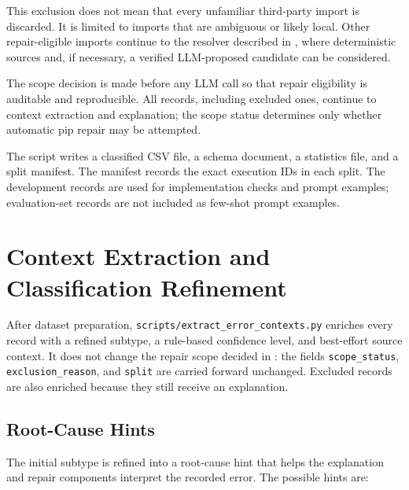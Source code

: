 This exclusion does not mean that every unfamiliar third-party import is
discarded. It is limited to imports that are ambiguous or likely local. Other
repair-eligible imports continue to the resolver described in
, where deterministic sources and, if necessary, a
verified LLM-proposed candidate can be considered.

The scope decision is made before any LLM call so that repair eligibility is
auditable and reproducible. All records, including excluded ones, continue
to context extraction and explanation; the scope status determines only
whether automatic pip repair may be attempted.

The script writes a classified CSV file, a schema document, a statistics
file, and a split manifest. The manifest records the exact execution IDs in
each split. The development records are used for implementation checks and
prompt examples; evaluation-set records are not included as few-shot prompt
examples.

\section{Context Extraction and Classification Refinement}
\label{sec:m-classification}

After dataset preparation, \texttt{scripts/extract\_error\_contexts.py}
enriches every record with a refined subtype, a rule-based confidence level,
and best-effort source context. It does not change the repair scope decided
in : the fields \texttt{scope\_status},
\texttt{exclusion\_reason}, and \texttt{split} are carried forward
unchanged. Excluded records are also enriched because they still receive an
explanation.

\subsection{Root-Cause Hints}

The initial subtype is refined into a root-cause hint that helps the
explanation and repair components interpret the recorded error. The possible
hints are:

